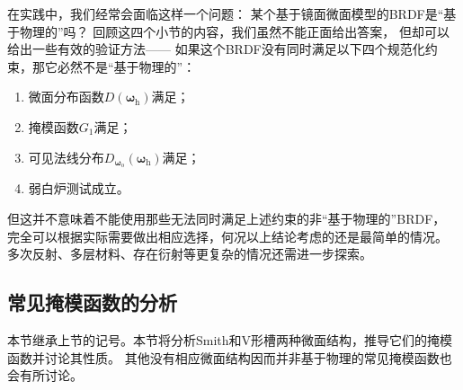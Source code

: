 在实践中，我们经常会面临这样一个问题：
某个基于镜面微面模型的BRDF是“基于物理的”吗？
回顾这四个小节的内容，我们虽然不能正面给出答案，
但却可以给出一些有效的验证方法——
如果这个BRDF没有同时满足以下四个规范化约束，那它必然不是“基于物理的”：
\begin{enumerate}
    \item 微面分布函数$D({\bm\omega}_{\mathrm{h}})$满足；
    \item 掩模函数$G_1$满足；
    \item 可见法线分布$D_{{\bm\omega}_{\mathrm{o}}}({\bm\omega}_{\mathrm{h}})$满足；
    \item 弱白炉测试成立。
\end{enumerate}
但这并不意味着不能使用那些无法同时满足上述约束的非“基于物理的”BRDF，
完全可以根据实际需要做出相应选择，何况以上结论考虑的还是最简单的情况。
多次反射、多层材料、存在衍射等更复杂的情况还需进一步探索。

\subsection{常见掩模函数的分析}\label{sub:常见掩模函数的分析}
本节继承上节的记号。本节将分析Smith和V形槽两种微面结构，推导它们的掩模函数并讨论其性质。
其他没有相应微面结构因而并非基于物理的常见掩模函数也会有所讨论。

